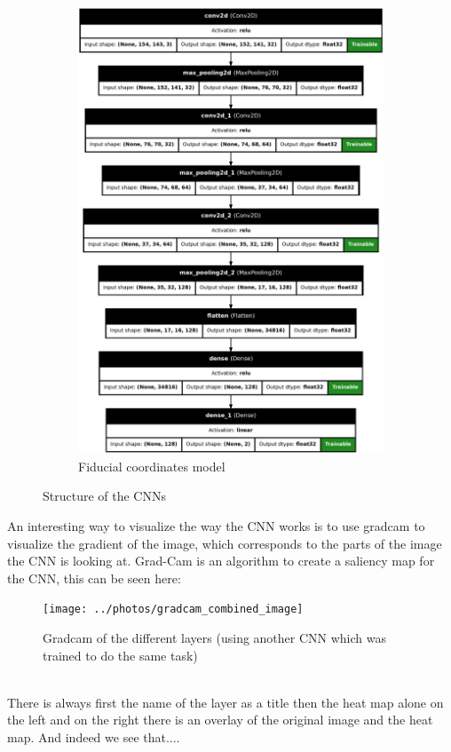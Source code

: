 \begin{figure}[H]
\begin{subfigure}{.5\textwidth}
        \includegraphics[width=.8\textwidth]{../photos/fiducial_coords_model}
        \caption[originalRainbow]{Fiducial coordinates model}
        \label{fig:fiducial_coords_model}
    \end{subfigure}
    \caption{Structure of the CNNs}
    \label{fig:CNN_structure}
\end{figure}
An interesting way to visualize the way the CNN works is to use gradcam\autocite{Selvaraju_2019} to visualize the gradient of the image, which corresponds to the parts of the image the CNN is looking at.
Grad-Cam is an algorithm to create a saliency map for the CNN, this can be seen here:
\begin{figure}[H]
    \centering
    \texttt{[image: ../photos/gradcam\_combined\_image]}
    \caption[cnn-gradcam]{Gradcam of the different layers (using another CNN which was trained to do the same task)}
    \label{fig:gradcam_combined_image}
\end{figure}\\
There is always first the name of the layer as a title then the heat map alone on the left and on the right there is an overlay of the original image and the heat map.
And indeed we see that....

